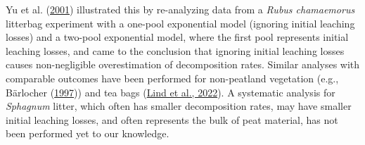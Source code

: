 \documentclass[
  12pt,
]{article}
\begin{document}
Yu et al. (\protect\hyperlink{ref-Yu.2001}{2001}) illustrated this by re-analyzing data from a \emph{Rubus chamaemorus} litterbag experiment with a one-pool exponential model (ignoring initial leaching losses) and a two-pool exponential model, where the first pool represents initial leaching losses, and came to the conclusion that ignoring initial leaching losses causes non-negligible overestimation of decomposition rates. Similar analyses with comparable outcomes have been performed for non-peatland vegetation (e.g., Bärlocher (\protect\hyperlink{ref-Barlocher.1997}{1997})) and tea bags (\protect\hyperlink{ref-Lind.2022}{Lind et al., 2022}). A systematic analysis for \emph{Sphagnum} litter, which often has smaller decomposition rates, may have smaller initial leaching losses, and often represents the bulk of peat material, has not been performed yet to our knowledge.
\end{document}
